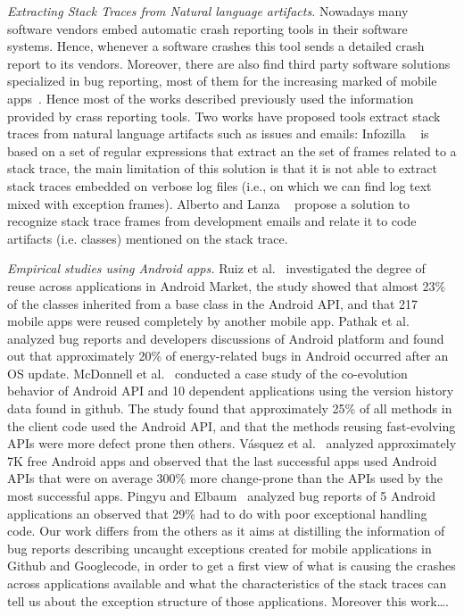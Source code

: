 \documentclass[conference]{IEEEtran}
\begin{document}
\textit{Extracting Stack Traces from Natural language artifacts.} Nowadays many software vendors embed automatic crash reporting tools in their software systems. Hence, whenever a software crashes this tool sends a detailed crash report to its vendors. Moreover, there are also find third party software solutions specialized in bug reporting, most of them for the increasing marked of mobile apps~\cite{BugSe14,BugSn14,Googl14,Acra14}. Hence most of the works described previously used the  information provided by crass reporting tools. Two works have proposed tools extract stack traces from natural language artifacts such as issues and emails: Infozilla ~\cite{bettenburg2008extracting} is based on a set of regular expressions that extract an the set of frames related to a stack trace, the main limitation of this solution is that it is not able to extract stack traces embedded on verbose log files (i.e., on which we can find log text mixed with exception frames). Alberto and Lanza ~\cite{bacchelli2012content}  propose a solution to recognize stack trace frames from development emails and relate it to code artifacts (i.e. classes) mentioned on the stack trace.    

\textit{Empirical studies using Android apps.} Ruiz et al.~\cite{Ruiz12} investigated the degree of reuse across applications in Android Market, the study showed that almost 23\% of the classes inherited
from a base class in the Android API, and that 217 mobile apps were reused
completely by another mobile app. Pathak et al.~\cite{Patha11} analyzed bug
reports and developers discussions of Android platform and found out that
approximately 20\% of energy-related bugs in Android occurred after an OS
update. McDonnell et al.~\cite{McDon13} conducted a case study of the
co-evolution behavior of Android API and 10 dependent applications using the
version history data found in github. The study found that approximately 25\% of
all methods in the client code used the Android API, and that the methods
reusing fast-evolving APIs were more defect prone then others. Vásquez et
al.~\cite{Linar13} analyzed approximately 7K free Android apps and observed that
the last successful apps used Android APIs that were on average 300\% more
change-prone than the APIs used by the most successful apps. Pingyu and
Elbaum~\cite{Zhang12} analyzed bug reports of 5 Android applications an observed
that 29\% had to do with poor exceptional handling code.  Our work differs from
the others as it aims at distilling the information of bug reports describing
uncaught exceptions created for mobile applications in Github and Googlecode, in
order to get a first view of what is causing the crashes across applications
available and what the characteristics of the stack traces can tell us about the
exception structure of those applications. Moreover this work\ldots.
\end{document}
